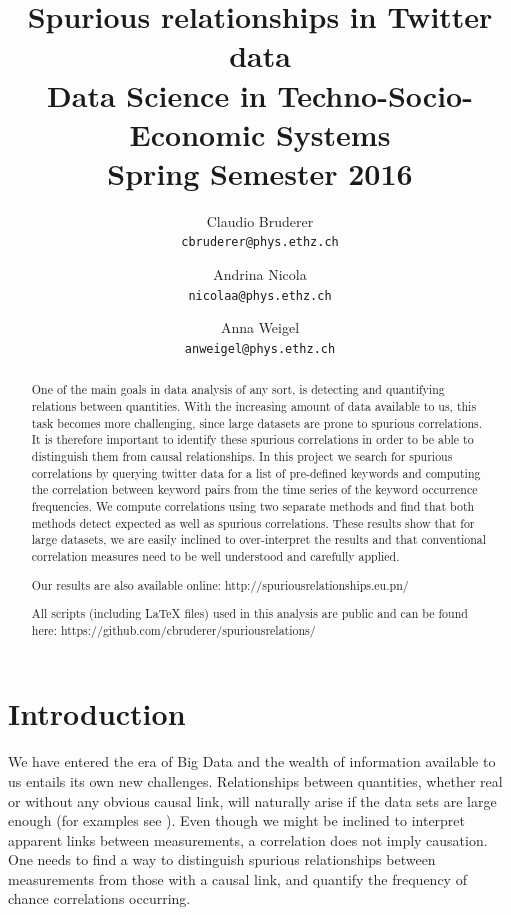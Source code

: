 \documentclass[12pt, a4paper]{article}
\author{
	Claudio Bruderer\\
	\texttt{cbruderer@phys.ethz.ch}
	\and
	Andrina Nicola\\
	\texttt{nicolaa@phys.ethz.ch}
	\and
	Anna Weigel\\
	\texttt{anweigel@phys.ethz.ch}
}
\title{Spurious relationships in Twitter data\\
	 	 \large Data Science in Techno-Socio-Economic Systems\\
	 	 \large Spring Semester 2016}
\begin{document}
\date{}
\maketitle

\begin{abstract}

One of the main goals in data analysis of any sort, is detecting and quantifying relations between quantities. With the increasing amount of data available to us, this task becomes more challenging, since large datasets are prone to spurious correlations. It is therefore important to identify these spurious correlations in order to be able to distinguish them from causal relationships. In this project we search for spurious correlations by querying twitter data for a list of pre-defined keywords and computing the correlation between keyword pairs from the time series of the keyword occurrence frequencies. We compute correlations using two separate methods and find that both methods detect expected as well as spurious correlations. These results show that for large datasets, we are easily inclined to over-interpret the results and that conventional correlation measures need to be well understood and carefully applied. 

\noindent Our results are also available online: http://spuriousrelationships.eu.pn/

\noindent All scripts (including \LaTeX$ $ files) used in this analysis are public and can be found here: https://github.com/cbruderer/spuriousrelations/

\end{abstract}


\vspace{0.2in}

\section{Introduction}
We have entered the era of Big Data and the wealth of information available to us entails its own new challenges. Relationships between quantities, whether real or without any obvious causal link, will naturally arise if the data sets are large enough (for examples see \cite{tyler_vigen}). Even though we might be inclined to interpret apparent links between measurements, a correlation does not imply causation. One needs to find a way to distinguish spurious relationships between measurements from those with a causal link, and quantify the frequency of chance correlations occurring.
\end{document}
